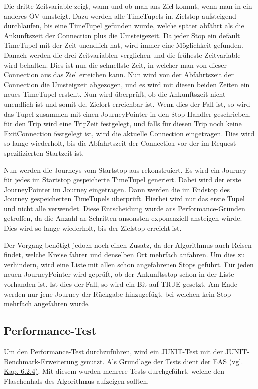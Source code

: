 Die dritte Zeitvariable zeigt, wann und ob man ans Ziel kommt, wenn man in ein anderes ÖV umsteigt. Dazu werden alle TimeTupels im Zielstop aufsteigend durchlaufen, bis eine TimeTupel gefunden wurde, welche später abfährt als die Ankunftszeit der Connection plus die Umsteigezeit. Da jeder Stop ein default TimeTupel mit der Zeit unendlich hat, wird immer eine Möglichkeit gefunden. 
Danach werden die drei Zeitvariablen verglichen und die früheste Zeitvariable wird behalten. Dies ist nun die schnellste Zeit, in welcher man von dieser Connection aus das Ziel erreichen kann. Nun wird von der Abfahrtszeit der Connection die Umsteigzeit abgezogen, und es wird mit diesen beiden Zeiten ein neues TimeTupel erstellt. Nun wird überprüft, ob die Ankunftszeit nicht unendlich ist und somit der Zielort erreichbar ist. Wenn dies der Fall ist, so wird das Tupel zusammen mit einen JourneyPointer in den Stop-Handler geschrieben, für den Trip wird eine TripZeit festgelegt, und falls für diesen Trip noch keine ExitConnection festgelegt ist, wird die aktuelle Connection eingetragen. Dies wird so lange wiederholt, bis die Abfahrtszeit der Connection vor der im Request spezifizierten Startzeit ist.
\newline


Nun werden die Journeys vom Startstop aus rekonstruiert. Es wird ein Journey für jedes im Startstop gespeicherte TimeTupel generiert. Dabei wird der erste JourneyPointer im Journey eingetragen. Dann werden die im Endstop des Journey gespeicherten TimeTupels überprüft. Hierbei wird nur das erste Tupel und nicht alle verwendet. Diese Entscheidung wurde aus Performance-Gründen getroffen, da die Anzahl an Schritten ansonsten exponenziell ansteigen würde. Dies wird so lange wiederholt, bis der Zielstop erreicht ist. 
\newline


Der Vorgang benötigt jedoch noch einen Zusatz, da der Algorithmus auch Reisen findet, welche Kreise fahren und denselben Ort mehrfach anfahren. Um dies zu verhindern, wird eine Liste mit allen schon angefahrenen Stops geführt. Für jeden neuen JourneyPointer wird geprüft, ob der Ankunftsstop schon in der Liste vorhanden ist. Ist dies der Fall, so wird ein Bit auf TRUE gesetzt. Am Ende werden nur jene Journey der Rückgabe hinzugefügt, bei welchen kein Stop mehrfach angefahren wurde.

\subsection{Performance-Test}
Um den Performance-Test durchzuführen, wird ein JUNIT-Test mit der JUNIT-Benchmark-Erweiterung genutzt. Als Grundlage der Tests dient der EAS \hyperlink{EAS}{(vgl. Kap. 6.2.4)}. Mit diesem wurden mehrere Tests durchgeführt, welche den Flaschenhals des Algorithmus aufzeigen sollten.
\newline


